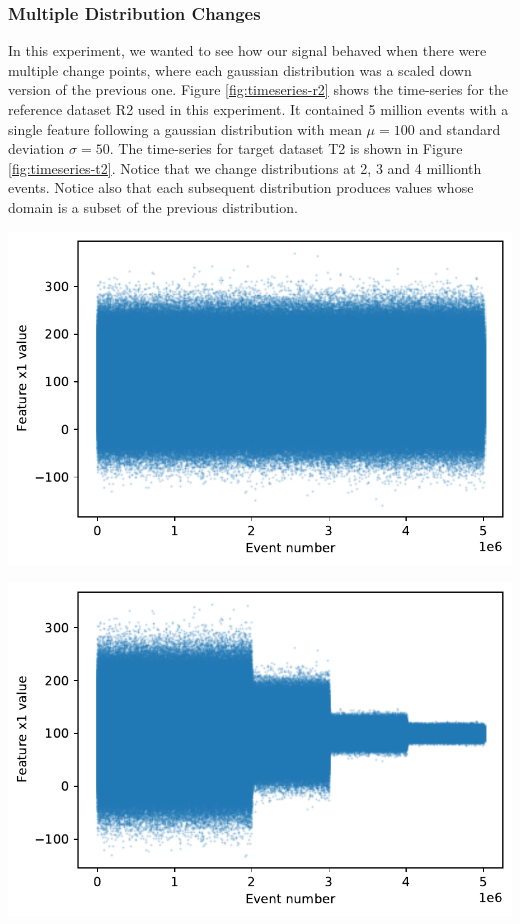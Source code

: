 \subsubsection{Multiple Distribution Changes}
In this experiment, we wanted to see how our signal behaved when there were multiple change points, where each gaussian distribution was a scaled down version of the previous one. Figure \ref{fig:timeseries-r2} shows the time-series for the reference dataset R2 used in this experiment. It contained 5 million events with a single feature following a gaussian distribution with mean $\mu=100$ and standard deviation $\sigma=50$. The time-series for target dataset T2 is shown in Figure \ref{fig:timeseries-t2}. Notice that we change distributions at 2, 3 and 4 millionth events. Notice also that each subsequent distribution produces values whose domain is a subset of the previous distribution.
\begin{center}
\begin{minipage}{.5\textwidth}
  \centering
  \includegraphics[width=1\linewidth]{figures/timeseries-r2.pdf}
  \label{fig:timeseries-r2}
\end{minipage}%
\begin{minipage}{.5\textwidth}
  \centering
  \includegraphics[width=1\linewidth]{figures/timeseries-t2.pdf}
  \label{fig:timeseries-t2}
\end{minipage}
\end{center}

